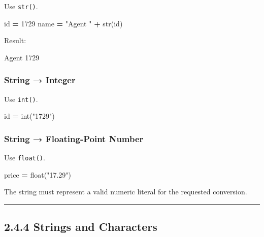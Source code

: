 \documentclass[
]{article}
\newenvironment{Shaded}{\begin{snugshade}}{\end{snugshade}}
\newcommand{\BuiltInTok}[1]{#1}
\newcommand{\DecValTok}[1]{\textcolor[rgb]{0.00,0.00,0.81}{#1}}
\newcommand{\NormalTok}[1]{#1}
\newcommand{\OperatorTok}[1]{\textcolor[rgb]{0.81,0.36,0.00}{\textbf{#1}}}
\newcommand{\StringTok}[1]{\textcolor[rgb]{0.31,0.60,0.02}{#1}}
\begin{document}
Use \texttt{str()}.

\begin{Shaded}
\begin{Highlighting}[]
\BuiltInTok{id} \OperatorTok{=} \DecValTok{1729}
\NormalTok{name }\OperatorTok{=} \StringTok{"Agent "} \OperatorTok{+} \BuiltInTok{str}\NormalTok{(}\BuiltInTok{id}\NormalTok{)}
\end{Highlighting}
\end{Shaded}

Result:

\begin{Shaded}
\begin{Highlighting}[]
\NormalTok{Agent 1729}
\end{Highlighting}
\end{Shaded}

\subsubsection{String → Integer}\label{string-integer}

Use \texttt{int()}.

\begin{Shaded}
\begin{Highlighting}[]
\BuiltInTok{id} \OperatorTok{=} \BuiltInTok{int}\NormalTok{(}\StringTok{"1729"}\NormalTok{)}
\end{Highlighting}
\end{Shaded}

\subsubsection{String → Floating-Point
Number}\label{string-floating-point-number}

Use \texttt{float()}.

\begin{Shaded}
\begin{Highlighting}[]
\NormalTok{price }\OperatorTok{=} \BuiltInTok{float}\NormalTok{(}\StringTok{"17.29"}\NormalTok{)}
\end{Highlighting}
\end{Shaded}

The string must represent a valid numeric literal for the requested
conversion.

\begin{center}\rule{0.5\linewidth}{0.5pt}\end{center}

\subsection{2.4.4 Strings and Characters}\label{strings-and-characters}
\end{document}
